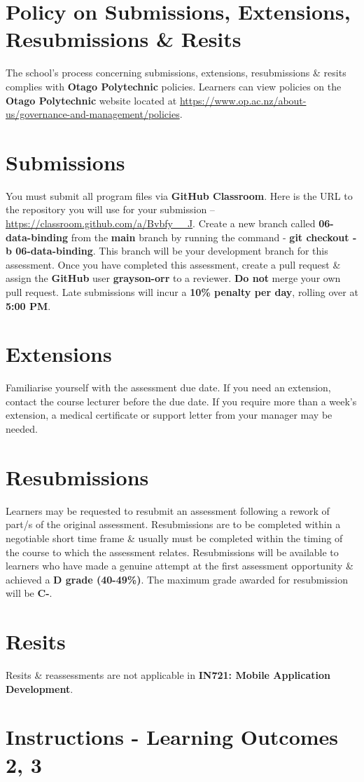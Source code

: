\documentclass{article}
\begin{document}
\section*{Policy on Submissions, Extensions, Resubmissions \& Resits}
The school's process concerning submissions, extensions, resubmissions \& resits complies with \textbf{Otago Polytechnic} policies. Learners can view policies on the \textbf{Otago Polytechnic} website located at \href{https://www.op.ac.nz/about-us/governance-and-management/policies}{https://www.op.ac.nz/about-us/governance-and-management/policies}.

\section*{Submissions}
You must submit all program files via \textbf{GitHub Classroom}. Here is the URL to the repository you will use for your submission – \href{https://classroom.github.com/a/Bvbfy\_\_J}{https://classroom.github.com/a/Bvbfy\_\_J}. Create a new branch called  \textbf{06-data-binding} from the \textbf{main} branch by running the command - \textbf{git checkout -b 06-data-binding}. This branch will be your development branch for this assessment. Once you have completed this assessment, create a pull request \& assign the \textbf{GitHub} user \textbf{grayson-orr} to a reviewer. \textbf{Do not} merge your own pull request. Late submissions will incur a \textbf{10\% penalty per day}, rolling over at \textbf{5:00 PM}.

\section*{Extensions}
Familiarise yourself with the assessment due date. If you need an extension, contact the course lecturer before the due date. If you require more than a week's extension, a medical certificate or support letter from your manager may be needed.

\section*{Resubmissions}
Learners may be requested to resubmit an assessment following a rework of part/s of the original assessment. Resubmissions are to be completed within a negotiable short time frame \& usually must be completed within the timing of the course to which the assessment relates. Resubmissions will be available to learners who have made a genuine attempt at the first assessment opportunity \& achieved a \textbf{D grade (40-49\%)}. The maximum grade awarded for resubmission will be \textbf{C-}.

\section*{Resits}
Resits \& reassessments are not applicable in \textbf{IN721: Mobile Application Development}.

\section*{Instructions - Learning Outcomes 2, 3}
\end{document}
